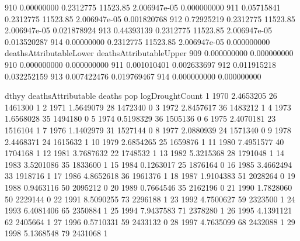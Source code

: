 \documentclass[a4paper]{article}                %
\begin{document}
\begin{Schunk}
\begin{Soutput}
910      0.00000000        0.2312775 11523.85 2.006947e-05        0.000000000
911      0.05715841        0.2312775 11523.85 2.006947e-05        0.001820768
912      0.72925219        0.2312775 11523.85 2.006947e-05        0.021878924
913      0.44393139        0.2312775 11523.85 2.006947e-05        0.013520287
914      0.00000000        0.2312775 11523.85 2.006947e-05        0.000000000
    deathsAttributableLower deathsAttributableUpper
909             0.000000000             0.000000000
910             0.000000000             0.000000000
911             0.001010401             0.002633697
912             0.011915218             0.032252159
913             0.007422476             0.019769467
914             0.000000000             0.000000000
\end{Soutput}
\begin{Soutput}
   dthyy deathsAttributable deaths     pop logDroughtCount
1   1970          2.4653205     26 1461300               1
2   1971          1.5649079     28 1472340               0
3   1972          2.8457617     36 1483212               1
4   1973          1.6568028     35 1494180               0
5   1974          0.5198329     36 1505136               0
6   1975          2.4070181     23 1516104               1
7   1976          1.1402979     31 1527144               0
8   1977          2.0880939     24 1571340               0
9   1978          2.4468371     24 1615632               1
10  1979          2.6854265     25 1659876               1
11  1980          7.4951577     40 1704168               1
12  1981          3.7687632     22 1748532               1
13  1982          5.3215368     28 1791048               1
14  1983          3.5201086     35 1833600               1
15  1984          0.1263017     25 1876164               0
16  1985          3.4662494     33 1918716               1
17  1986          4.8652618     36 1961376               1
18  1987          1.9104383     51 2028264               0
19  1988          0.9463116     50 2095212               0
20  1989          0.7664546     35 2162196               0
21  1990          1.7828060     50 2229144               0
22  1991          8.5090255     73 2296188               1
23  1992          4.7500627     59 2323500               1
24  1993          6.4081406     65 2350884               1
25  1994          7.9437583     71 2378280               1
26  1995          4.1391121     62 2405664               1
27  1996          0.5710331     59 2433132               0
28  1997          4.7635099     68 2432088               1
29  1998          5.1368548     79 2431068               1

\end{Soutput}
\end{Schunk}
\end{document}
